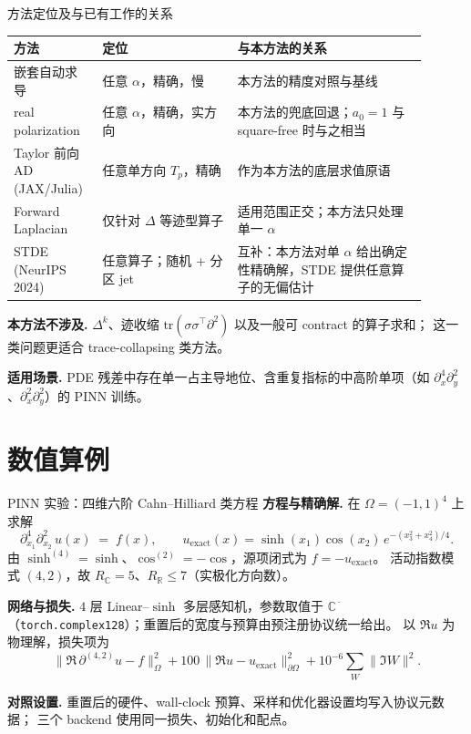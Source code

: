 \documentclass[10pt,aspectratio=169]{beamer}
\newcommand{\R}{\mathbb{R}}
\newcommand{\C}{\mathbb{C}}
\newcommand{\Tp}{T_p}
\begin{document}
\begin{frame}{方法定位及与已有工作的关系}
  \begin{tabular}{p{0.18\linewidth}p{0.30\linewidth}p{0.42\linewidth}}
    \toprule
    \textbf{方法} & \textbf{定位} & \textbf{与本方法的关系} \\
    \midrule
    嵌套自动求导 & 任意 $\alpha$，精确，慢 & 本方法的精度对照与基线 \\[2pt]
    real polarization & 任意 $\alpha$，精确，实方向 & 本方法的兜底回退；$a_0=1$ 与 square-free 时与之相当 \\[2pt]
    Taylor 前向 AD\,(JAX/Julia) & 任意单方向 $\Tp$，精确 & 作为本方法的底层求值原语 \\[2pt]
    Forward Laplacian & 仅针对 $\Delta$ 等迹型算子 & 适用范围正交；本方法只处理单一 $\alpha$ \\[2pt]
    STDE\,(NeurIPS 2024) & 任意算子；随机 + 分区 jet & 互补：本方法对单 $\alpha$ 给出确定性精确解，STDE 提供任意算子的无偏估计 \\
    \bottomrule
  \end{tabular}

  \medskip
  \textbf{本方法不涉及.}\;
  $\Delta^k$、迹收缩 $\mathrm{tr}(\sigma\sigma^{\top}\partial^2)$ 以及一般可 contract 的算子求和；
  这一类问题更适合 trace-collapsing 类方法。

  \medskip
  \textbf{适用场景.}\;
  PDE 残差中存在单一占主导地位、含重复指标的中高阶单项（如 $\partial_x^4\partial_y^2$、$\partial_x^2\partial_y^2$）的 PINN 训练。
\end{frame}

\section{数值算例}

\begin{frame}{PINN 实验：四维六阶 Cahn--Hilliard 类方程}
  \textbf{方程与精确解.}\;
  在 $\Omega=(-1,1)^4$ 上求解
  \[
    \partial_{x_1}^{4}\partial_{x_2}^{2}\,u(x) \;=\; f(x),
    \qquad
    u_{\mathrm{exact}}(x)=\sinh(x_1)\cos(x_2)\,e^{-(x_3^2+x_4^2)/4}.
  \]
  由 $\sinh^{(4)}=\sinh$、$\cos^{(2)}=-\cos$，源项闭式为 $f=-u_{\mathrm{exact}}$。
  活动指数模式 $(4,2)$，故 $R_\C=5$、$R_\R\le 7$（实极化方向数）。

  \medskip
  \textbf{网络与损失.}\;
  $4$ 层 Linear--$\sinh$ 多层感知机，参数取值于
  $\C^{\,\cdot}$（\texttt{torch.complex128}）；重置后的宽度与预算由预注册协议统一给出。
  以 $\Re u$ 为物理解，损失项为
  \[
    \|\Re\,\partial^{(4,2)} u - f\|_{\Omega}^{2}
    + 100\,\|\Re u - u_{\mathrm{exact}}\|_{\partial\Omega}^{2}
    + 10^{-6}\sum_{W}\|\Im W\|^{2}.
  \]

  \medskip
  \textbf{对照设置.}\;
  重置后的硬件、wall-clock 预算、采样和优化器设置均写入协议元数据；
  三个 backend 使用同一损失、初始化和配点。
\end{frame}
\end{document}
